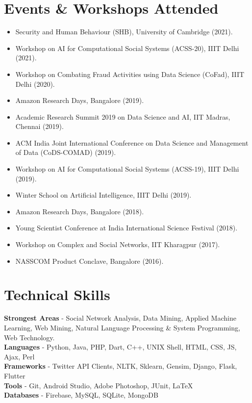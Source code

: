 \documentclass[margin, centered]{res}
\begin{document}
\begin{resume}
\section{Events \& Workshops Attended}
\begin{itemize}[leftmargin=*]
\item Security and Human Behaviour (SHB), University of Cambridge (2021).
\item Workshop on AI for Computational Social Systems (ACSS-20), IIIT Delhi (2021).
\item Workshop on Combating Fraud Activities using Data Science (CoFad), IIIT Delhi (2020).
\item Amazon Research Days, Bangalore (2019).
\item Academic Research Summit 2019 on Data Science and AI, IIT Madras, Chennai (2019).
\item ACM India Joint International Conference on Data Science and Management of Data (CoDS-COMAD) (2019).
\item Workshop on AI for Computational Social Systems (ACSS-19), IIIT Delhi (2019).
\item Winter School on Artificial Intelligence,  IIIT Delhi (2019).
\item Amazon Research Days, Bangalore (2018).
\item Young Scientist Conference at India International Science Festival (2018).
\item Workshop on Complex and Social Networks, IIT Kharagpur (2017).
\item NASSCOM Product Conclave, Bangalore (2016).
\end{itemize}


\section{Technical \hspace{2mm} Skills}
\textbf{Strongest Areas} - Social Network Analysis, Data Mining, Applied Machine Learning, Web Mining, Natural Language Processing \& System Programming, Web Technology.  \\
\textbf{Languages} - Python, Java, PHP, Dart, C++, UNIX Shell, HTML, CSS, JS, Ajax, Perl \\
\textbf{Frameworks} - Twitter API Clients, NLTK, Sklearn, Gensim, Django, Flask, Flutter \\
\textbf{Tools} - Git, Android Studio, Adobe Photoshop, JUnit, \LaTeX \\
\textbf{Databases} - Firebase, MySQL, SQLite, MongoDB \\


\end{resume}
\end{document}
